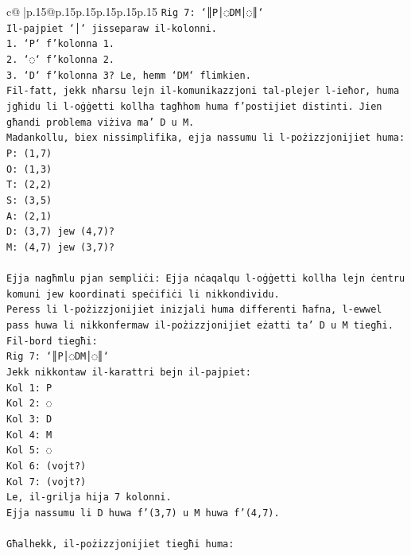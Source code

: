 \documentclass{article}
\begin{document}
{\begin{supertabular}{c@{$\;$}|p{.15\linewidth}@{}p{.15\linewidth}p{.15\linewidth}p{.15\linewidth}p{.15\linewidth}p{.15\linewidth}}
{{{\texttt{Rig 7: `║P│◌DM│◌║`} \\
\texttt{Il{-}pajpiet `│` jisseparaw il{-}kolonni.} \\
\texttt{1. `P` f'kolonna 1.} \\
\texttt{2. `◌` f'kolonna 2.} \\
\texttt{3. `D` f'kolonna 3? Le, hemm `DM` flimkien.} \\
\texttt{Fil{-}fatt, jekk nħarsu lejn il{-}komunikazzjoni tal{-}plejer l{-}ieħor, huma jgħidu li l{-}oġġetti kollha tagħhom huma f'postijiet distinti. Jien għandi problema viżiva ma' D u M.} \\
\texttt{Madankollu, biex nissimplifika, ejja nassumu li l{-}pożizzjonijiet huma:} \\
\texttt{P: (1,7)} \\
\texttt{O: (1,3)} \\
\texttt{T: (2,2)} \\
\texttt{S: (3,5)} \\
\texttt{A: (2,1)} \\
\texttt{D: (3,7) jew (4,7)?} \\
\texttt{M: (4,7) jew (3,7)?} \\
\\ 
\texttt{Ejja nagħmlu pjan sempliċi: Ejja nċaqalqu l{-}oġġetti kollha lejn ċentru komuni jew koordinati speċifiċi li nikkondividu.} \\
\texttt{Peress li l{-}pożizzjonijiet inizjali huma differenti ħafna, l{-}ewwel pass huwa li nikkonfermaw il{-}pożizzjonijiet eżatti ta' D u M tiegħi.} \\
\texttt{Fil{-}bord tiegħi:} \\
\texttt{Rig 7: `║P│◌DM│◌║`} \\
\texttt{Jekk nikkontaw il{-}karattri bejn il{-}pajpiet:} \\
\texttt{Kol 1: P} \\
\texttt{Kol 2: ◌} \\
\texttt{Kol 3: D} \\
\texttt{Kol 4: M} \\
\texttt{Kol 5: ◌} \\
\texttt{Kol 6: (vojt?)} \\
\texttt{Kol 7: (vojt?)} \\
\texttt{Le, il{-}grilja hija 7 kolonni.} \\
\texttt{Ejja nassumu li D huwa f'(3,7) u M huwa f'(4,7).} \\
\\ 
\texttt{Għalhekk, il{-}pożizzjonijiet tiegħi huma:} \\
}}}
\end{supertabular}}
\end{document}
